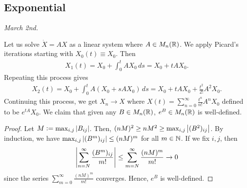 \subsection{Exponential}

\noindent \textit{March 2nd.}

Let us solve $\dot{X} = AX$ as a linear system where $A \in M_{n}(\mathbb{R})$. We apply Picard's iterations starting with $X_{0}(t) \equiv X_{0}$. Then
\begin{align}
    X_{1}(t) = X_{0} + \int_{0}^{t} A X_{0} \, ds = X_{0} + t A X_{0}.
\end{align}
Repeating this process gives
\begin{align}
    X_{2}(t) = X_{0} + \int_{0}^{t} A(X_{0} + s A X_{0}) \, ds = X_{0} + t A X_{0} + \frac{t^{2}}{2!} A^{2} X_{0}.
\end{align}
Continuing this process, we get $X_{n} \to X$ where $X(t) = \sum_{n=0}^{\infty} \frac{t^{n}}{n!} A^{n} X_{0}$ defined to be $e^{tA} X_{0}$. We claim that given any $B \in M_{n}(\mathbb{R})$, $e^{B} \in M_{n}(\mathbb{R})$ is well-defined.

\begin{proof}
    Let $M \vcentcolon= \max_{i,j} \left| B_{ij} \right|$. Then, $(nM)^{2} \geq nM^{2} \geq \max_{i,j} \left| (B^{2})_{ij} \right|$. By induction, we have $\max_{i,j} \left| (B^{m})_{ij} \right| \leq (nM)^{m}$ for all $m \in \mathbb{N}$. If we fix $i,j$, then
    \begin{align}
        \left| \sum_{n=N}^{\infty} \frac{(B^{m})_{ij}}{m!} \right| \leq \sum_{m=N}^{\infty} \frac{(nM)^{m}}{m!} \to 0
    \end{align}
    since the series $\sum_{m=0}^{\infty} \frac{(nM)^{m}}{m!}$ converges. Hence, $e^{B}$ is well-defined.
\end{proof}

